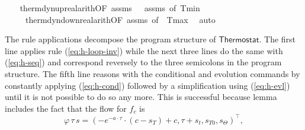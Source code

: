 \documentclass[envcountsame,envcountsect]{llncs}
\newcommand{\flow}{\varphi}
\begin{document}
\begin{example}
\begin{isabellebody}
\ \ \isamarkupfalse%
\ therm{\isacharunderscore}dyn{\isacharunderscore}up{\isacharunderscore}real{\isacharunderscore }arith{\isacharbrackleft}OF\ assms{\isacharparenleft}{}{\isacharparenright}\ {\isacharunderscore}\ {\isacharunderscore}\ assms{\isacharparenleft}{}{\isacharparenright}{\isacharcomma}\ of\ Tmin{\isacharbrackright}\isanewline
\ \ \ \ \ therm{\isacharunderscore}dyn{\isacharunderscore}down{\isacharunderscore }real{\isacharunderscore}arith{\isacharbrackleft}OF\ assms{\isacharparenleft}{}{\isacharcomma}{}{\isacharparenright}{\isacharcomma}\ of\ {\isacharunderscore}\ Tmax{\isacharbrackright}\ \isamarkupfalse%
\ auto\isanewline
\end{isabellebody}

The rule applications decompose the program structure of $\mathsf{Thermostat}$. The first line applies rule (\ref{eq:h-loop-inv}) while the next three lines do the same with (\ref{eq:h-seq}) and correspond reversely to the three semicolons in the program structure. The fifth line reasons with the conditional and evolution commands by constantly applying (\ref{eq:h-cond}) followed by a simplification using (\ref{eq:h-evl}) until it is not possible to do so any more. This is successful because lemma  includes the fact that the flow for $f_c$ is  
\begin{equation*}
\flow\, \tau\, s = (-e^{-a\cdot\tau}\cdot(c-s_T)+c, \tau+s_t, s_{T0}, s_\Theta)^\top,
\end{equation*}



\end{example}
\end{document}
